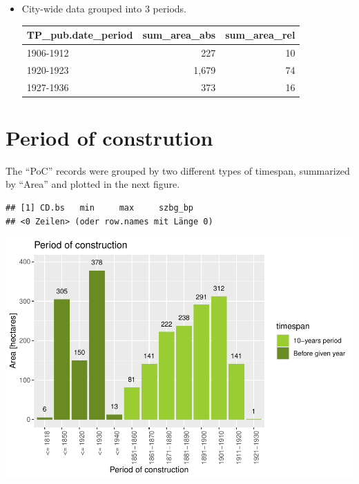 \documentclass[
]{article}
\providecommand{\tightlist}{%
  \setlength{\itemsep}{0pt}\setlength{\parskip}{0pt}}
\begin{document}
\begin{itemize}
\tightlist
\item
  City-wide data grouped into 3 periods.

  \begin{tabular}[t]{l|r|r}
  \hline
  TP\_pub.date\_period & sum\_area\_abs & sum\_area\_rel\\
  \hline
  1906-1912 & 227 & 10\\
  \hline
  1920-1923 & 1,679 & 74\\
  \hline
  1927-1936 & 373 & 16\\
  \hline
  \end{tabular}
\end{itemize}

\hypertarget{period-of-constrution}{%
\section{Period of constrution}\label{period-of-constrution}}

The ``PoC'' records were grouped by two different types of timespan,
summarized by ``Area'' and plotted in the next figure.

\begin{verbatim}
## [1] CD.bs   min     max     szbg_bp
## <0 Zeilen> (oder row.names mit Länge 0)
\end{verbatim}

\includegraphics{Usage_code_files/figure-latex/unnamed-chunk-8-1.pdf}
\end{document}
